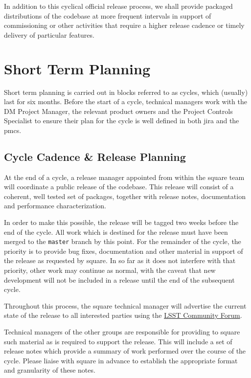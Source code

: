 In addition to this cyclical official release process, we shall provide
packaged distributions of the codebase at more frequent intervals in
support of commissioning or other activities that require a higher
release cadence or timely delivery of particular features.

\section{Short Term Planning}
\label{sec:cycle-plan}

Short term planning is carried out in blocks referred to as \glspl{cycle}, which (usually) last for six months.
Before the start of a \gls{cycle}, technical managers work with the DM Project Manager, the relevant product owners and the Project Controls Specialist to ensure their plan for the \gls{cycle} is well defined in both \gls{jira} and the \gls{pmcs}.

\subsection{Cycle Cadence \& Release Planning}
\label{sec:cycle-cadence}

At the end of a \gls{cycle}, a release manager appointed from within the \gls{square} team will coordinate a public release of the codebase.
This release will consist of a coherent, well tested set of packages, together with release notes, documentation and performance characterization.

In order to make this possible, the release will be tagged two weeks before the end of the \gls{cycle}.
All work which is destined for the release must have been merged to the \texttt{master} branch by this point.
For the remainder of the \gls{cycle}, the priority is to provide bug fixes, documentation and other material in support of the release as requested by \gls{square}.
In so far as it does not interfere with that priority, other work may continue as normal, with the caveat that new development will not be included in a release until the end of the subsequent \gls{cycle}.

Throughout this process, the \gls{square} technical manager will advertise the
current state of the release to all interested parties using the
\href{https://community.lsst.org/}{LSST Community Forum}.

Technical managers of the other groups are responsible for providing to \gls{square} such material as is required to support the release.
This will include a set of release notes which provide a summary of work performed over the course of the \gls{cycle}.
Please liaise with \gls{square} in advance to establish the appropriate format and granularity of these notes.

